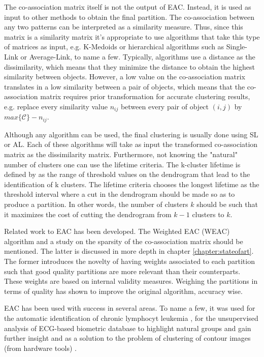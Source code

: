 The co-association matrix itself is not the output of EAC.
Instead, it is used as input to other methods to obtain the final partition.
The co-association between any two patterns can be interpreted as a similarity measure.
Thus, since this matrix is a similarity matrix it's appropriate to use algorithms that take this type of matrices as input, e.g. K-Medoids or hierarchical algorithms such as Single-Link or Average-Link, to name a few.
Typically, algorithms use a distance as the dissimilarity, which means that they minimize the distance to obtain the highest similarity between objects.
However, a low value on the co-association matrix translates in a low similarity between a pair of objects, which means that the co-association matrix requires prior transformation for accurate clustering results, e.g. replace every similarity value $n_{ij}$ between every pair of object $(i,j)$ by $max \{ \mathcal{C} \} - n_{ij}$.

Although any algorithm can be used, the final clustering is usually done using SL or AL.
Each of these algorithms will take as input the transformed co-association matrix as the dissimilarity matrix.
Furthermore, not knowing the "natural" number of clusters one can use the lifetime criteria.
The k-cluster lifetime is defined by \citet{Fred2005} as the range of threshold values on the dendrogram that lead to the identification of k clusters.
The lifetime criteria chooses the longest lifetime as the threshold interval where a cut in the dendrogram should be made so as to produce a partition.
In other words, the number of clusters $k$ should be such that it maximizes the cost of cutting the dendrogram from $k-1$ clusters to $k$.


Related work to EAC has been developed.
The Weighted EAC (WEAC) algorithm \cite{Duarte2005} and a study on the sparsity of the co-association matrix \cite{Lourenco2010} should be mentioned.
The latter is discussed in more depth in chapter \ref{chapter:stateofart}.
The former introduces the novelty of having weights associated to each partition such that good quality partitions are more relevant than their counterparts.
These weights are based on internal validity measures.
Weighing the partitions in terms of quality has shown to improve the original algorithm, accuracy wise.


EAC has been used with success in several areas.
To name a few, it was used for the automatic identification of chronic lymphocyt leukemia \cite{Qian2010}, for the unsupervised analysis of ECG-based biometric database to highlight natural groups and gain further insight \cite{lourenco2014ecg} and as a solution to the problem of clustering of contour images (from hardware tools) \cite{Lourenco2007}.

